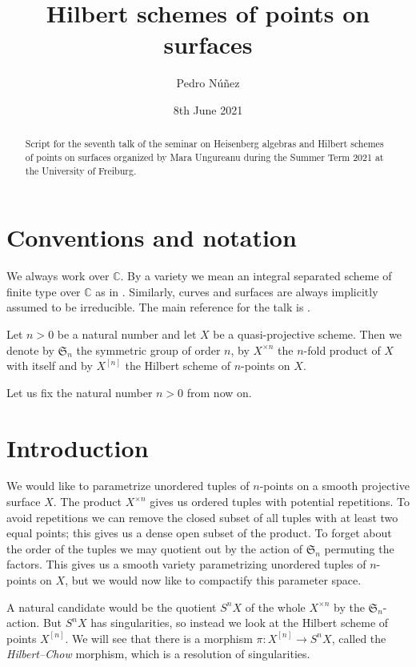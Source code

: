 \documentclass[12pt,a4paper]{amsart}
\title[Hilbert schemes of points on surfaces]{Hilbert schemes of points on surfaces}
\author[Pedro N\'{u}\~{n}ez]{Pedro N\'{u}\~{n}ez}
\date{8th June 2021}
\theoremstyle{plain}
\theoremstyle{definition}
\theoremstyle{remark}
\begin{document}
\maketitle

\begin{abstract}
  Script for the seventh talk of the seminar on Heisenberg algebras and Hilbert schemes of points on surfaces organized by Mara Ungureanu during the Summer Term 2021 at the University of Freiburg.
\end{abstract}

\tableofcontents

\setcounter{section}{-1}

\section{Conventions and notation}

We always work over $\mathbb{C}$.
By a variety we mean an integral separated scheme of finite type over $\mathbb{C}$ as in \cite{har77}.
Similarly, curves and surfaces are always implicitly assumed to be irreducible.
The main reference for the talk is \cite[\S 1]{nak99}.

Let $n > 0$ be a natural number and let $X$ be a quasi-projective scheme.
Then we denote by $\mathfrak{S}_{n}$ the symmetric group of order $n$, by $X^{\times n}$ the $n$-fold product of $X$ with itself and by $X^{[n]}$ the Hilbert scheme of $n$-points on $X$.

Let us fix the natural number $n > 0$ from now on.

\section{Introduction}

We would like to parametrize unordered tuples of $n$-points on a smooth projective surface $X$.
The product $X^{\times n}$ gives us ordered tuples with potential repetitions.
To avoid repetitions we can remove the closed subset of all tuples with at least two equal points; this gives us a dense open subset of the product.
To forget about the order of the tuples we may quotient out by the action of $\mathfrak{S}_{n}$ permuting the factors.
This gives us a smooth variety parametrizing unordered tuples of $n$-points on $X$, but we would now like to compactify this parameter space.

A natural candidate would be the quotient $S^{n}X$ of the whole $X^{\times n}$ by the $\mathfrak{S}_{n}$-action.
But $S^{n}X$ has singularities, so instead we look at the Hilbert scheme of points $X^{[n]}$.
We will see that there is a morphism $\pi \colon X^{[n]} \to S^{n}X$, called the \textit{Hilbert--Chow} morphism, which is a resolution of singularities.
\end{document}

